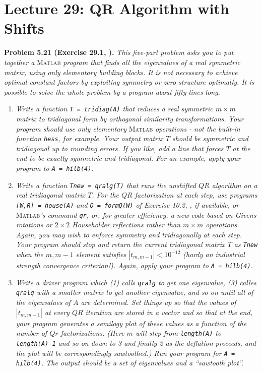 \documentclass[a4paper,oneside]{book}
\numberwithin{equation}{chapter}
\begin{document}
\section{Lecture 29: QR Algorithm with Shifts}
\textbf{Problem 5.21 (Exercise 29.1, \cite{1}).} \textit{This five-part problem asks you to put together a}\textsc{ Matlab}\textit{ program that finds all the eigenvalues of a real symmetric matrix, using only elementary building blocks. It is not necessary to achieve optimal constant factors by exploiting symmetry or zero structure optimally. It is possible to solve the whole problem by a program about fifty lines long.}
\begin{enumerate}
\item \textit{Write a function \texttt{T = tridiag(A)} that reduces a real symmetric $m\times m$ matrix to tridiagonal form by orthogonal similarity transformations. Your program should use only elementary }\textsc{ Matlab}\textit{ operations - not the built-in function \texttt{hess}, for example. Your output matrix $T$ should be symmetric and tridiagonal up to rounding errors. If you like, add a line that forces $T$ at the end to be exactly symmetric and tridiagonal. For an example, apply your program to \texttt{A = hilb(4)}.}
\item \textit{Write a function \texttt{Tnew = qralg(T)} that runs the unshifted $QR$ algorithm on a real tridiagonal matrix $T$. For the $QR$ factorization at each step, use programs \texttt{[W,R] = house(A)} and \texttt{Q = formQ(W)} of Exercise 10.2, \cite{1}, if available, or}\textsc{ Matlab}\textit{'s command \texttt{qr}, or, for greater efficiency, a new code based on Givens rotations or $2\times 2$ Householder reflections rather than $m\times m$ operations. Again, you may wish to enforce symmetry and tridiagonally at each step. Your program should stop and return the current tridiagonal matrix $T$ as \texttt{Tnew} when the $m,m-1$ element satisfies $\left| {{t_{m,m - 1}}} \right| < {10^{ - 12}}$ (hardy an industrial strength convergence criterion!). Again, apply your program to \texttt{A = hilb(4)}.}
\item \textit{Write a driver program which (1) calls \texttt{qralg} to get one eigenvalue, (3) calles \texttt{qralq} with a smaller matrix to get another eigenvalue, and so on until all of the eigenvalues of $A$ are determined. Set things up so that the values of $\left| {{t_{m,m - 1}}} \right|$ at every $QR$ iteration are stored in a vector and so that at the end, your program generates a semilogy plot of these values as a function of the number of $Qr$ factorizations. (Here $m$ will step from \texttt{length(A)} to \texttt{length(A)-1} and so on down to 3 and finally 2 as the deflation proceeds, and the plot will be correspondingly sawtoothed.) Run your program for \texttt{A = hilb(4)}. The output should be a set of eigenvalues and a ``sawtooth plot''.}

\end{enumerate}
\end{document}
